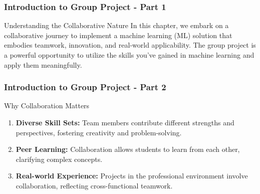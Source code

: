\documentclass[aspectratio=169]{beamer}
\begin{document}
\frame{\titlepage}

\begin{frame}[fragile]
    \frametitle{Introduction to Group Project - Part 1}
    \begin{block}{Understanding the Collaborative Nature}
        In this chapter, we embark on a collaborative journey to implement a machine learning (ML) solution that embodies teamwork, innovation, and real-world applicability. The group project is a powerful opportunity to utilize the skills you’ve gained in machine learning and apply them meaningfully.
    \end{block}
\end{frame}

\begin{frame}[fragile]
    \frametitle{Introduction to Group Project - Part 2}
    \begin{block}{Why Collaboration Matters}
        \begin{enumerate}
            \item \textbf{Diverse Skill Sets:} Team members contribute different strengths and perspectives, fostering creativity and problem-solving.
            \item \textbf{Peer Learning:} Collaboration allows students to learn from each other, clarifying complex concepts.
            \item \textbf{Real-world Experience:} Projects in the professional environment involve collaboration, reflecting cross-functional teamwork.
        \end{enumerate}
    \end{block}
\end{frame}
\end{document}
